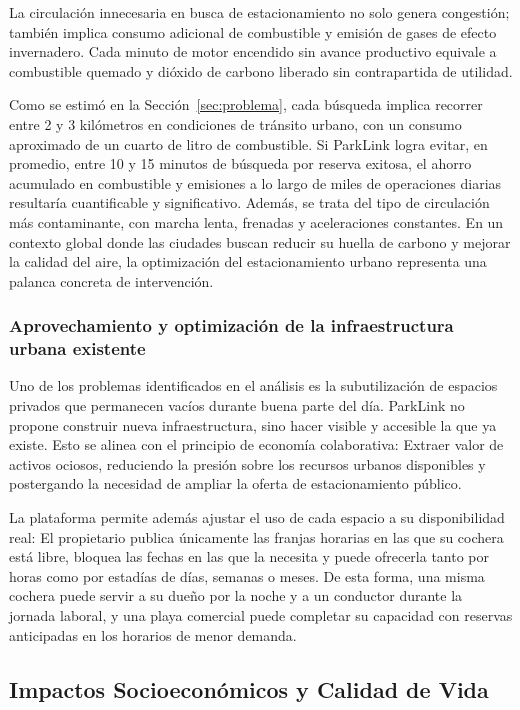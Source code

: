 La circulación innecesaria en busca de estacionamiento no solo genera congestión; también implica consumo adicional de combustible y emisión de gases de efecto invernadero. Cada minuto de motor encendido sin avance productivo equivale a combustible quemado y dióxido de carbono liberado sin contrapartida de utilidad.

Como se estimó en la Sección~\ref{sec:problema}, cada búsqueda implica recorrer entre 2 y 3 kilómetros en condiciones de tránsito urbano, con un consumo aproximado de un cuarto de litro de combustible. Si ParkLink logra evitar, en promedio, entre 10 y 15 minutos de búsqueda por reserva exitosa, el ahorro acumulado en combustible y emisiones a lo largo de miles de operaciones diarias resultaría cuantificable y significativo. Además, se trata del tipo de circulación más contaminante, con marcha lenta, frenadas y aceleraciones constantes. En un contexto global donde las ciudades buscan reducir su huella de carbono y mejorar la calidad del aire, la optimización del estacionamiento urbano representa una palanca concreta de intervención.

\subsubsection{Aprovechamiento y optimización de la infraestructura urbana existente}

Uno de los problemas identificados en el análisis es la subutilización de espacios privados que permanecen vacíos durante buena parte del día. ParkLink no propone construir nueva infraestructura, sino hacer visible y accesible la que ya existe. Esto se alinea con el principio de economía colaborativa: Extraer valor de activos ociosos, reduciendo la presión sobre los recursos urbanos disponibles y postergando la necesidad de ampliar la oferta de estacionamiento público.

La plataforma permite además ajustar el uso de cada espacio a su disponibilidad real: El propietario publica únicamente las franjas horarias en las que su cochera está libre, bloquea las fechas en las que la necesita y puede ofrecerla tanto por horas como por estadías de días, semanas o meses. De esta forma, una misma cochera puede servir a su dueño por la noche y a un conductor durante la jornada laboral, y una playa comercial puede completar su capacidad con reservas anticipadas en los horarios de menor demanda.

\subsection{Impactos Socioeconómicos y Calidad de Vida}

